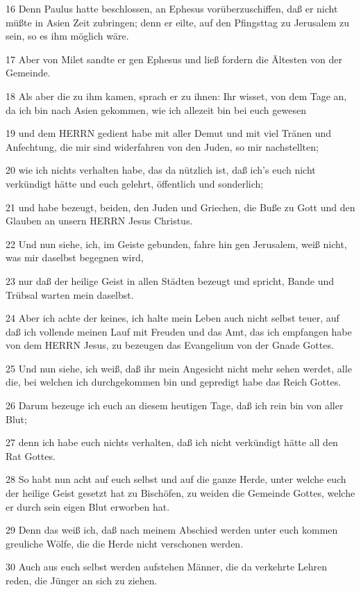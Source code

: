 \par 16 Denn Paulus hatte beschlossen, an Ephesus vorüberzuschiffen, daß er nicht müßte in Asien Zeit zubringen; denn er eilte, auf den Pfingsttag zu Jerusalem zu sein, so es ihm möglich wäre.
\par 17 Aber von Milet sandte er gen Ephesus und ließ fordern die Ältesten von der Gemeinde.
\par 18 Als aber die zu ihm kamen, sprach er zu ihnen: Ihr wisset, von dem Tage an, da ich bin nach Asien gekommen, wie ich allezeit bin bei euch gewesen
\par 19 und dem HERRN gedient habe mit aller Demut und mit viel Tränen und Anfechtung, die mir sind widerfahren von den Juden, so mir nachstellten;
\par 20 wie ich nichts verhalten habe, das da nützlich ist, daß ich's euch nicht verkündigt hätte und euch gelehrt, öffentlich und sonderlich;
\par 21 und habe bezeugt, beiden, den Juden und Griechen, die Buße zu Gott und den Glauben an unsern HERRN Jesus Christus.
\par 22 Und nun siehe, ich, im Geiste gebunden, fahre hin gen Jerusalem, weiß nicht, was mir daselbst begegnen wird,
\par 23 nur daß der heilige Geist in allen Städten bezeugt und spricht, Bande und Trübsal warten mein daselbst.
\par 24 Aber ich achte der keines, ich halte mein Leben auch nicht selbst teuer, auf daß ich vollende meinen Lauf mit Freuden und das Amt, das ich empfangen habe von dem HERRN Jesus, zu bezeugen das Evangelium von der Gnade Gottes.
\par 25 Und nun siehe, ich weiß, daß ihr mein Angesicht nicht mehr sehen werdet, alle die, bei welchen ich durchgekommen bin und gepredigt habe das Reich Gottes.
\par 26 Darum bezeuge ich euch an diesem heutigen Tage, daß ich rein bin von aller Blut;
\par 27 denn ich habe euch nichts verhalten, daß ich nicht verkündigt hätte all den Rat Gottes.
\par 28 So habt nun acht auf euch selbst und auf die ganze Herde, unter welche euch der heilige Geist gesetzt hat zu Bischöfen, zu weiden die Gemeinde Gottes, welche er durch sein eigen Blut erworben hat.
\par 29 Denn das weiß ich, daß nach meinem Abschied werden unter euch kommen greuliche Wölfe, die die Herde nicht verschonen werden.
\par 30 Auch aus euch selbst werden aufstehen Männer, die da verkehrte Lehren reden, die Jünger an sich zu ziehen.
